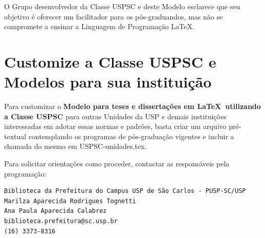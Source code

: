 O Grupo desenvolvedor da Classe USPSC e deste Modelo esclarece que seu objetivo é oferecer um facilitador para os pós-graduandos, mas não se compromete a ensinar a Linguagem de Programação \LaTeX .  

\section{Customize a Classe USPSC e Modelos para sua instituição}

Para customizar o \textbf{Modelo para teses e dissertações em \LaTeX\ utilizando a Classe USPSC} para outras Unidades da USP e demais instituições interessadas em adotar essas normas e padrões, basta criar um arquivo pré-textual contemplando os programas de pós-graduação vigentes e incluir a chamada do mesmo em USPSC-unidades.tex.

Para solicitar orientações como proceder, contactar as responsáveis pela programação:

\begin{verbatim}
Biblioteca da Prefeitura do Campus USP de São Carlos - PUSP-SC/USP
Marilza Aparecida Rodrigues Tognetti
Ana Paula Aparecida Calabrez
biblioteca.prefeitura@sc.usp.br
(16) 3373-8316
\end{verbatim}





